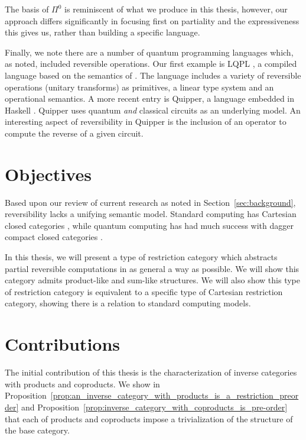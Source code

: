 The basis of $\Pi^0$ is reminiscent of what we produce in this thesis, however, our approach differs
significantly in focusing first on partiality and the expressiveness this gives us, rather than
building a specific language.


Finally, we note there are a number of quantum programming languages which, as noted, included
reversible operations. Our first example is LQPL \cite{giles2007}, a compiled language based on the
semantics of \cite{selinger04:qpl}. The language includes a variety of reversible operations
(unitary transforms) as primitives, a linear type system and an operational semantics. A more recent
entry is Quipper, \cite{green2013introduction,green2013quipper} a language embedded in Haskell
\cite{peyton2003:haskell98}. Quipper uses quantum \emph{and} classical circuits as an underlying
model. An interesting aspect of reversibility in Quipper is the inclusion of an operator to compute
the reverse of a given circuit.

\section{Objectives}
\label{sec:objectives}

Based upon our review of current research as noted in Section~\ref{sec:background}, reversibility
lacks a unifying semantic model. Standard computing has Cartesian closed categories
\cite{barr:ctcs}, while quantum computing has had much success with dagger compact closed categories
\cite{selinger04:towardssemantics,selinger05:dagger,abramsky05:abstractscalars}.

In this thesis, we will present a type of restriction category which abstracts partial reversible
computations in as general a way as possible. We will show this category admits product-like and
sum-like structures. We will also show this type of restriction category is equivalent to a specific
type of Cartesian restriction category, showing there is a relation to standard computing models.

\section{Contributions}
\label{sec:contributions}

The initial contribution of this thesis is the characterization of inverse categories with products
and coproducts.
We show in Proposition~\ref{prop:an_inverse_category_with_products_is_a_restriction_preorder}
and Proposition~\ref{prop:inverse_category_with_coproducts_is_pre-order} that each of products and
coproducts impose a trivialization of the structure of the base category.

